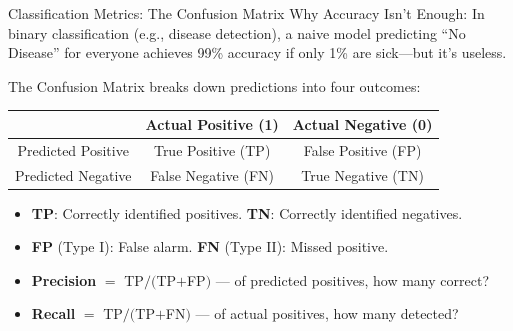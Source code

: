 \documentclass[aspectratio=169]{beamer}
\newcommand{\1}{\mathbf{1}}
\begin{document}
\begin{frame}{Classification Metrics: The Confusion Matrix}
    \small
    Why Accuracy Isn't Enough:
    In binary classification (e.g., disease detection), a naive model predicting ``No Disease'' for everyone achieves 99\% accuracy if only 1\% are sick—but it's useless.

    \vspace{0.1em}
    The Confusion Matrix breaks down predictions into four outcomes:
    
    \vspace{0.1em}
    \begin{center}
    \renewcommand{\arraystretch}{1.2}
    \begin{tabular}{|c|c|c|}
        \hline
         & Actual Positive (1) & Actual Negative (0) \\ \hline
        Predicted Positive 
        & \cellcolor{green!25} True Positive (TP) 
        & \cellcolor{red!25} False Positive (FP) \\ \hline
        Predicted Negative 
        & \cellcolor{orange!25} False Negative (FN) 
        & True Negative (TN) \\ \hline
    \end{tabular}
    \end{center}
    
    \vspace{0.2em}
    \begin{itemize}
        \setlength\itemsep{0.1em}
        \item \textbf{TP}: Correctly identified positives. \textbf{TN}: Correctly identified negatives.
        \item \textbf{FP} (Type I): False alarm. \textbf{FN} (Type II): Missed positive.
        \item \textbf{Precision} $=$ \textcolor{green!70!black}{TP}$/($\textcolor{green!70!black}{TP}$+$\textcolor{red!70!black}{FP}$)$ — of predicted positives, how many correct?
        \item \textbf{Recall} $=$ \textcolor{green!70!black}{TP}$/($\textcolor{green!70!black}{TP}$+$\textcolor{orange!70!black}{FN}$)$ — of actual positives, how many detected?
    \end{itemize}
\end{frame}
\end{document}
